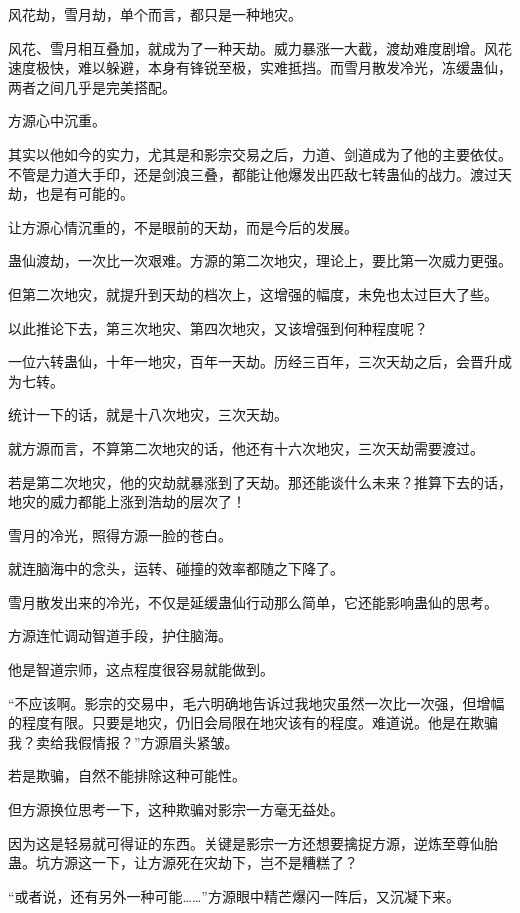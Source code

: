 
\begin{this_body}

风花劫，雪月劫，单个而言，都只是一种地灾。

风花、雪月相互叠加，就成为了一种天劫。威力暴涨一大截，渡劫难度剧增。风花速度极快，难以躲避，本身有锋锐至极，实难抵挡。而雪月散发冷光，冻缓蛊仙，两者之间几乎是完美搭配。

方源心中沉重。

其实以他如今的实力，尤其是和影宗交易之后，力道、剑道成为了他的主要依仗。不管是力道大手印，还是剑浪三叠，都能让他爆发出匹敌七转蛊仙的战力。渡过天劫，也是有可能的。

让方源心情沉重的，不是眼前的天劫，而是今后的发展。

蛊仙渡劫，一次比一次艰难。方源的第二次地灾，理论上，要比第一次威力更强。

但第二次地灾，就提升到天劫的档次上，这增强的幅度，未免也太过巨大了些。

以此推论下去，第三次地灾、第四次地灾，又该增强到何种程度呢？

一位六转蛊仙，十年一地灾，百年一天劫。历经三百年，三次天劫之后，会晋升成为七转。

统计一下的话，就是十八次地灾，三次天劫。

就方源而言，不算第二次地灾的话，他还有十六次地灾，三次天劫需要渡过。

若是第二次地灾，他的灾劫就暴涨到了天劫。那还能谈什么未来？推算下去的话，地灾的威力都能上涨到浩劫的层次了！

雪月的冷光，照得方源一脸的苍白。

就连脑海中的念头，运转、碰撞的效率都随之下降了。

雪月散发出来的冷光，不仅是延缓蛊仙行动那么简单，它还能影响蛊仙的思考。

方源连忙调动智道手段，护住脑海。

他是智道宗师，这点程度很容易就能做到。

“不应该啊。影宗的交易中，毛六明确地告诉过我地灾虽然一次比一次强，但增幅的程度有限。只要是地灾，仍旧会局限在地灾该有的程度。难道说。他是在欺骗我？卖给我假情报？”方源眉头紧皱。

若是欺骗，自然不能排除这种可能性。

但方源换位思考一下，这种欺骗对影宗一方毫无益处。

因为这是轻易就可得证的东西。关键是影宗一方还想要擒捉方源，逆炼至尊仙胎蛊。坑方源这一下，让方源死在灾劫下，岂不是糟糕了？

“或者说，还有另外一种可能……”方源眼中精芒爆闪一阵后，又沉凝下来。


\end{this_body}
